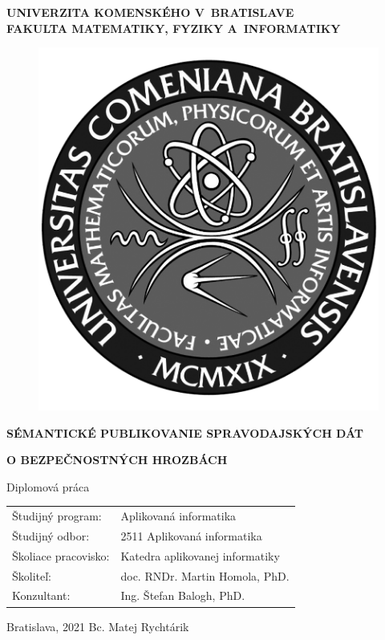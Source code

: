 \documentclass[12pt, a4paper, oneside]{book}
\newcommand\mftitle{Sémantické publikovanie spravodajských dát}
\newcommand\mftitlen{o bezpečnostných hrozbách}
\newcommand\mfthesistype{Diplomová práca}
\newcommand\mfauthor{Bc. Matej Rychtárik}
\newcommand\mfadvisor{doc. RNDr. Martin Homola, PhD.}
\newcommand\mfconsultant{Ing. Štefan Balogh, PhD.}
\newcommand\mfplacedate{Bratislava, 2021}
\newcommand\mfuniversity{UNIVERZITA KOMENSKÉHO V~BRATISLAVE}
\newcommand\mffaculty{FAKULTA MATEMATIKY, FYZIKY A~INFORMATIKY}
\begin{document}
\noindent
\begin{minipage}{\textwidth}
\begin{center}
\textbf{\mfuniversity \\
\mffaculty}
\end{center}
\end{minipage}

\vfill
\begin{figure}[!hbt]
\begin{center}
\includegraphics{images/logo_fmph_dark}
\label{img:logo_dark}
\end{center}
\end{figure}
\begin{center}
\begin{minipage}{0.8\textwidth}
\centerline{\textbf{\large\MakeUppercase{\mftitle}}}
\centerline{\textbf{\large\MakeUppercase{\mftitlen}}}
\smallskip
\centerline{\mfthesistype}
\end{minipage}
\end{center}
\vfill
\begin{tabular}{l l}
Študijný program: & Aplikovaná informatika\\
Študijný odbor: & 2511 Aplikovaná informatika\\
Školiace pracovisko: & Katedra aplikovanej informatiky\\
Školiteľ: & \mfadvisor \\
Konzultant: & \mfconsultant
\end{tabular}
\vfill
\noindent
\mfplacedate \hfill
\mfauthor
\eject 
\end{document}
